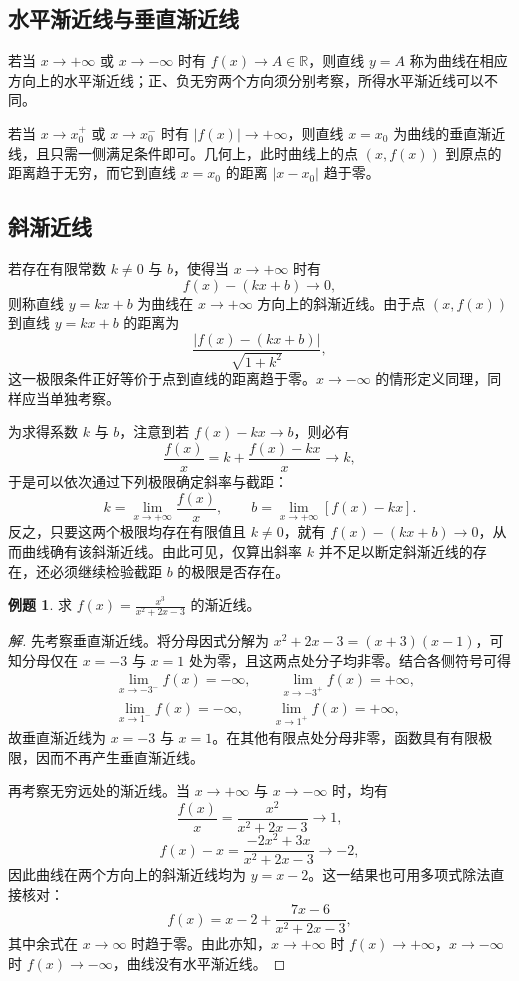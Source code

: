 \documentclass[UTF8,fontset=fandol,a4paper,12pt]{ctexart}
\newcommand{\R}{\mathbb R}
\theoremstyle{definition}
\newtheorem*{example}{例题}
\begin{document}
\subsection*{水平渐近线与垂直渐近线}
若当 $x\to+\infty$ 或 $x\to-\infty$ 时有 $f(x)\to A\in\R$，则直线 $y=A$ 称为曲线在相应方向上的水平渐近线；正、负无穷两个方向须分别考察，所得水平渐近线可以不同。

若当 $x\to x_0^+$ 或 $x\to x_0^-$ 时有 $|f(x)|\to+\infty$，则直线 $x=x_0$ 为曲线的垂直渐近线，且只需一侧满足条件即可。几何上，此时曲线上的点 $(x,f(x))$ 到原点的距离趋于无穷，而它到直线 $x=x_0$ 的距离 $|x-x_0|$ 趋于零。

\subsection*{斜渐近线}
若存在有限常数 $k\ne0$ 与 $b$，使得当 $x\to+\infty$ 时有
\[
 f(x)-(kx+b)\to0,
\]
则称直线 $y=kx+b$ 为曲线在 $x\to+\infty$ 方向上的斜渐近线。由于点 $(x,f(x))$ 到直线 $y=kx+b$ 的距离为
\[
 \frac{|f(x)-(kx+b)|}{\sqrt{1+k^2}},
\]
这一极限条件正好等价于点到直线的距离趋于零。$x\to-\infty$ 的情形定义同理，同样应当单独考察。

为求得系数 $k$ 与 $b$，注意到若 $f(x)-kx\to b$，则必有
\[
 \frac{f(x)}x=k+\frac{f(x)-kx}{x}\to k,
\]
于是可以依次通过下列极限确定斜率与截距：
\[
 \boxed{k=\lim_{x\to+\infty}\frac{f(x)}x,\qquad
 b=\lim_{x\to+\infty}[f(x)-kx].}
\]
反之，只要这两个极限均存在有限值且 $k\ne0$，就有 $f(x)-(kx+b)\to0$，从而曲线确有该斜渐近线。由此可见，仅算出斜率 $k$ 并不足以断定斜渐近线的存在，还必须继续检验截距 $b$ 的极限是否存在。

\begin{example}
求 $\displaystyle f(x)=\frac{x^3}{x^2+2x-3}$ 的渐近线。
\end{example}
\begin{proof}[解]
先考察垂直渐近线。将分母因式分解为 $x^2+2x-3=(x+3)(x-1)$，可知分母仅在 $x=-3$ 与 $x=1$ 处为零，且这两点处分子均非零。结合各侧符号可得
\[
 \begin{aligned}
 &\lim_{x\to-3^-}f(x)=-\infty,\qquad
 \lim_{x\to-3^+}f(x)=+\infty,\\
 &\lim_{x\to1^-}f(x)=-\infty,\qquad
 \lim_{x\to1^+}f(x)=+\infty,
 \end{aligned}
\]
故垂直渐近线为 $x=-3$ 与 $x=1$。在其他有限点处分母非零，函数具有有限极限，因而不再产生垂直渐近线。

再考察无穷远处的渐近线。当 $x\to+\infty$ 与 $x\to-\infty$ 时，均有
\[
 \frac{f(x)}x=\frac{x^2}{x^2+2x-3}\to1,
\]
\[
 f(x)-x=\frac{-2x^2+3x}{x^2+2x-3}\to-2,
\]
因此曲线在两个方向上的斜渐近线均为 $y=x-2$。这一结果也可用多项式除法直接核对：
\[
 f(x)=x-2+\frac{7x-6}{x^2+2x-3},
\]
其中余式在 $x\to\infty$ 时趋于零。由此亦知，$x\to+\infty$ 时 $f(x)\to+\infty$，$x\to-\infty$ 时 $f(x)\to-\infty$，曲线没有水平渐近线。
\end{proof}
\end{document}
